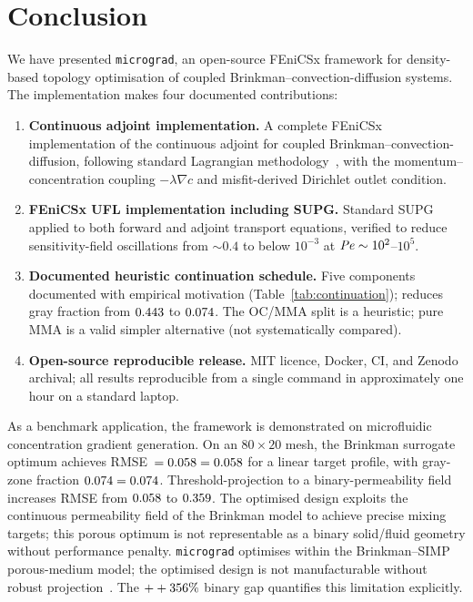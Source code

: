 \section{Conclusion}
\label{sec:conclusion}

We have presented \texttt{micrograd}, an open-source FEniCSx framework
for density-based topology optimisation of coupled
Brinkman--convection-diffusion systems.
The implementation makes four documented contributions:

\begin{enumerate}
    \item \textbf{Continuous adjoint implementation.}
          A complete FEniCSx implementation of the continuous adjoint
          for coupled Brinkman--convection-diffusion, following
          standard Lagrangian methodology~\cite{borrvall2003},
          with the momentum--concentration coupling $-\lambda\nabla c$
          and misfit-derived Dirichlet outlet condition.

    \item \textbf{FEniCSx UFL implementation including SUPG.}
          Standard SUPG~\cite{donea2003} applied to both forward
          and adjoint transport equations, verified to reduce
          sensitivity-field oscillations from $\sim0.4$ to
          below $10^{-3}$ at $\mathit{Pe}\sim10^2$--$10^5$.

    \item \textbf{Documented heuristic continuation schedule.}
          Five components documented with empirical motivation
          (Table~\ref{tab:continuation});
          reduces gray fraction from $0.443$ to $0.074$.
          The OC/MMA split is a heuristic; pure MMA is a
          valid simpler alternative (not systematically compared).

    \item \textbf{Open-source reproducible release.}
          MIT licence, Docker, CI, and Zenodo archival;
          all results reproducible from a single command
          in approximately one hour on a standard laptop.
\end{enumerate}

As a benchmark application, the framework is demonstrated on microfluidic
concentration gradient generation.
On an $80\times20$ mesh, the Brinkman surrogate optimum achieves
RMSE~$=0.058=0.058$ for a linear target profile, with gray-zone
fraction $0.074=0.074$.
Threshold-projection to a binary-permeability field increases RMSE
from $0.058$ to $0.359$.
The optimised design exploits the continuous permeability field of the
Brinkman model to achieve precise mixing targets;
this porous optimum is not representable as a binary solid/fluid
geometry without performance penalty.
\texttt{micrograd} optimises within the Brinkman--SIMP
porous-medium model; the optimised design is not manufacturable
without robust projection~\cite{wang2011}.
The $++356\%$ binary gap quantifies this limitation
explicitly.

